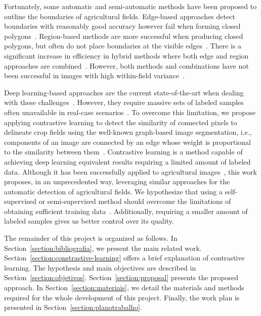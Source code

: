 \documentclass[12pt]{article}
\begin{document}
Fortunately, some automatic and semi-automatic methods have been proposed to outline the boundaries of agricultural fields. Edge-based approaches detect boundaries with reasonably good accuracy however fail when forming closed polygons~\cite{taravat2021,waldner2021}. Region-based methods are more successful when producing closed polygons, but often do not place boundaries at the visible edges~\cite{taravat2021}. There is a significant increase in efficiency in hybrid methods where both edge and region approaches are combined~\cite{garcia2017}. However, both methods and combinations have not been successful in images with high within-field variance~\cite{mueller2004,zhang2021}.

Deep learning-based approaches are the current state-of-the-art when dealing with these challenges~\citep{waldner2021,zhang2021}. However, they require massive sets of labeled samples often unavailable in real-case scenarios~\cite{kokkinos2016, ma2019,kamilaris2018}. 
To overcome this limitation, we propose applying contrastive learning to detect the similarity of connected pixels to delineate crop fields using the well-known graph-based image segmentation, i.e., components of an image are connected by an edge whose weight is proportional to the similarity between them~\citep{felzenszwalb2004}. Contrastive learning is a method capable of achieving deep learning equivalent results requiring a limited amount of labeled data. Although it has been successfully applied to agricultural images~\cite{guldenring2021,jansel2021}, this work proposes, in an unprecedented way, leveraging similar approaches for the automatic detection of agricultural fields. We hypothesize that using a self-supervised or semi-supervised method should overcome the limitations of obtaining sufficient training data~\citep{yang2020}. Additionally, requiring a smaller amount of labeled samples gives us better control over its quality.

The remainder of this project is organized as follows. In Section~\ref{section:bibliografia}, we present the main related work. Section~\ref{section:constrastive-learning} offers a brief explanation of contrastive learning. The hypothesis and main objectives are described in Section~\ref{section:objetivos}. Section~\ref{section:proposal} presents the proposed approach. In Section~\ref{section:materiais}, we detail the materials and methods required for the whole development of this project. Finally, the work plan is presented in Section~\ref{section:planotrabalho}.
\end{document}
